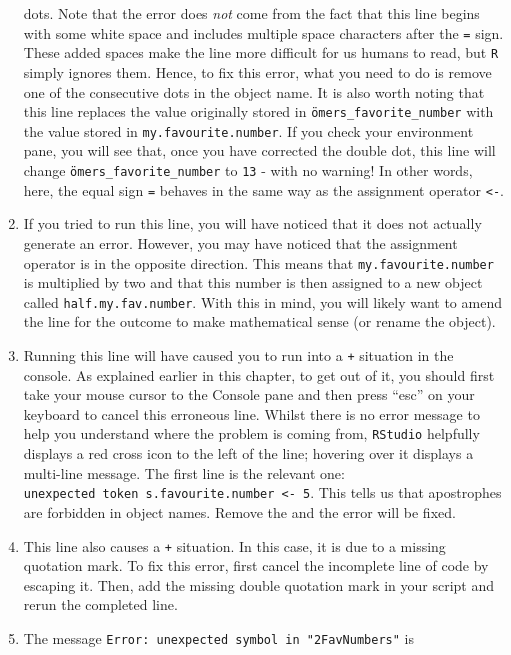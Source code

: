 \documentclass[
  letterpaper,
  DIV=11,
  numbers=noendperiod]{scrreprt}
\begin{document}
\begin{tcolorbox}
\begin{enumerate}
  dots. Note that the error does \emph{not} come from the fact that this
  line begins with some white space and includes multiple space
  characters after the \texttt{=} sign. These added spaces make the line
  more difficult for us humans to read, but \texttt{R} simply ignores
  them. Hence, to fix this error, what you need to do is remove one of
  the consecutive dots in the object name. It is also worth noting that
  this line replaces the value originally stored in
  \texttt{ömers\_favorite\_number} with the value stored in
  \texttt{my.favourite.number}. If you check your environment pane, you
  will see that, once you have corrected the double dot, this line will
  change \texttt{ömers\_favorite\_number} to \texttt{13} - with no
  warning! In other words, here, the equal sign \texttt{=} behaves in
  the same way as the assignment operator \texttt{\textless{}-}.
\item
  If you tried to run this line, you will have noticed that it does not
  actually generate an error. However, you may have noticed that the
  assignment operator is in the opposite direction. This means that
  \texttt{my.favourite.number} is multiplied by two and that this number
  is then assigned to a new object called \texttt{half.my.fav.number}.
  With this in mind, you will likely want to amend the line for the
  outcome to make mathematical sense (or rename the object).
\item
  Running this line will have caused you to run into a \texttt{+}
  situation in the console. As explained earlier in this chapter, to get
  out of it, you should first take your mouse cursor to the Console pane
  and then press ``esc'' on your keyboard to cancel this erroneous line.
  Whilst there is no error message to help you understand where the
  problem is coming from, \texttt{RStudio} helpfully displays a red
  cross icon to the left of the line; hovering over it displays a
  multi-line message. The first line is the relevant one:
  \texttt{unexpected\ token\ \textquotesingle{}s.favourite.number\ \textless{}-\ 5}.
  This tells us that apostrophes are forbidden in object names. Remove
  the \texttt{\textquotesingle{}} and the error will be fixed.
\item
  This line also causes a \texttt{+} situation. In this case, it is due
  to a missing quotation mark. To fix this error, first cancel the
  incomplete line of code by escaping it. Then, add the missing double
  quotation mark in your script and rerun the completed line.
\item
  The message \texttt{Error:\ unexpected\ symbol\ in\ "2FavNumbers"} is

\end{enumerate}
\end{tcolorbox}
\end{document}
